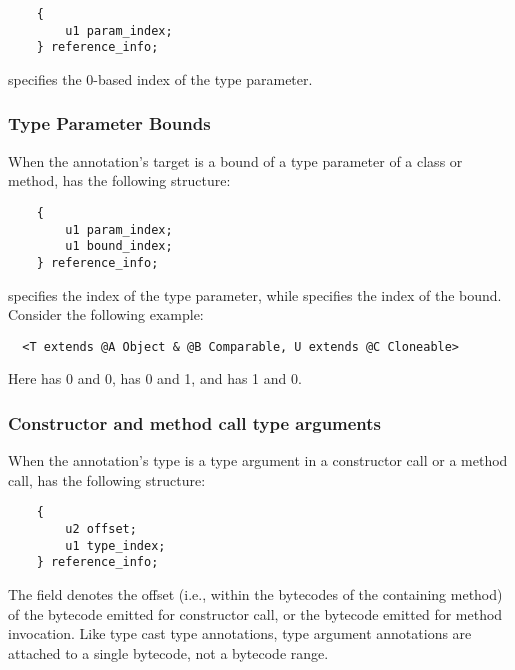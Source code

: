\documentclass[10pt]{article}
\begin{document}
\begin{Verbatim}
    {
        u1 param_index;
    } reference_info;
\end{Verbatim}

 specifies the 0-based index of the type parameter.

\subsubsection{Type Parameter Bounds\label{class-file:ext:ri:tpbound}}

When the annotation's target is a bound of a type parameter of a class or
method,  has the following structure:

\begin{Verbatim}
    {
        u1 param_index;
        u1 bound_index;
    } reference_info;
\end{Verbatim}

 specifies the index of the type parameter, while
 specifies the index of the bound.  Consider the following
example:

\begin{Verbatim}
  <T extends @A Object & @B Comparable, U extends @C Cloneable>
\end{Verbatim}

\noindent
Here
 has  0 and  0,
 has  0 and  1, and
 has  1 and  0.

\subsubsection{Constructor and method call type arguments\label{class-file:ext:ri:con-typearg}}

When the annotation's type is a type argument in a constructor call or
a method call,  has the following structure:

\begin{Verbatim}
    {
        u2 offset;
        u1 type_index;
    } reference_info;
\end{Verbatim}

The  field denotes the offset (i.e., within the bytecodes
of the containing method) of the  bytecode emitted for
constructor call, or the
 bytecode emitted for
method invocation.  Like type cast type annotations, type argument
annotations are attached to a single bytecode, not a bytecode range.
\end{document}
